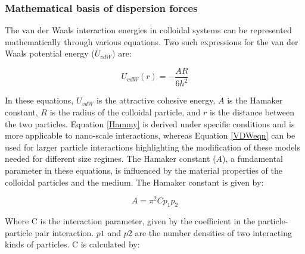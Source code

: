 \subsubsection{Mathematical basis of dispersion forces} %

The van der Waals interaction energies in colloidal systems can be represented mathematically through various equations. Two such expressions for the van der Waals potential energy (\(U_{vdW}\)) are:

\begin{equation}  %
U_{vdW} (r) = - \frac{A  R}{6h^2} 
\label{Hammy}
\end{equation}




In these equations, \(U_{vdW}\) is the attractive cohesive energy, \(A\) is the Hamaker constant, \(R\) is the radius of the colloidal particle, and \(r\) is the distance between the two particles. Equation \ref{Hammy} is derived under specific conditions and is more applicable to nano-scale interactions, whereas Equation \ref{VDWeqn} can be used for larger particle interactions highlighting the modification of these models needed for different size regimes. The Hamaker constant (\(A\)), a fundamental parameter in these equations, is influenced by the material properties of the colloidal particles and the medium. The Hamaker constant is given by:

\begin{equation} %
A = \pi^2 C p_1 p_2
\end{equation}

Where C is the interaction parameter, given by the coefficient in the particle-particle pair interaction. $p1$ and $p2$ are the number densities of two interacting kinds of particles.\cite{?} C is calculated by:

